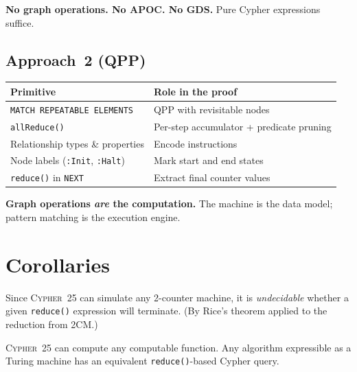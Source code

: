 \documentclass[11pt,a4paper]{article}
\begin{document}
\begin{neoquote}
\textbf{No graph operations. No APOC. No GDS.}
Pure Cypher expressions suffice.
\end{neoquote}

\subsection{Approach~2 (QPP)}

\begin{center}
\begin{tabular}{@{}lp{8.5cm}@{}}
\toprule
\textbf{Primitive} & \textbf{Role in the proof} \\
\midrule
\texttt{MATCH REPEATABLE ELEMENTS} & QPP with revisitable nodes \\
\texttt{allReduce()} & Per-step accumulator + predicate pruning \\
Relationship types \& properties & Encode instructions \\
Node labels (\texttt{:Init}, \texttt{:Halt}) & Mark start and end states \\
\texttt{reduce()} in \texttt{NEXT} & Extract final counter values \\
\bottomrule
\end{tabular}
\end{center}

\begin{neoquote}
\textbf{Graph operations \emph{are} the computation.}
The machine is the data model; pattern matching is the execution engine.
\end{neoquote}


\section{Corollaries}

\begin{factbox}
Since \textsc{Cypher~25} can simulate any 2-counter machine, it is
\emph{undecidable} whether a given \texttt{reduce()} expression
will terminate.
(By Rice's theorem applied to the reduction from 2CM.)
\end{factbox}

\begin{factbox}
\textsc{Cypher~25} can compute any computable function.
Any algorithm expressible as a Turing machine has an equivalent
\texttt{reduce()}-based Cypher query.
\end{factbox}
\end{document}

